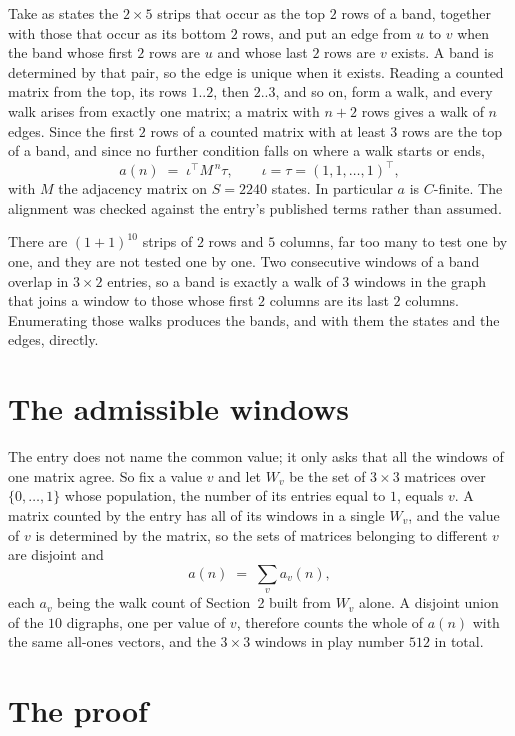 \documentclass[11pt,a4paper]{article}
\theoremstyle{plain}
\theoremstyle{definition}
\begin{document}
Take as states the $2\times5$ strips that occur as the top $2$ rows of a band,
together with those that occur as its bottom $2$ rows, and put an edge from $u$ to $v$
when the band whose first $2$ rows are $u$ and whose last $2$ rows are $v$ exists.
A band is determined by that pair, so the edge is unique when it exists. Reading a counted
matrix from the top, its rows $1..2$, then $2..3$, and so on, form a walk, and every
walk arises from exactly one matrix; a matrix with $n+2$ rows gives a walk of $n$ edges.
Since the first $2$ rows of a counted matrix with at least $3$ rows are the top of a
band, and since no further condition falls on where a walk starts or ends,
\[
a(n)\;=\;\iota^{\!\top}M^{\,n}\tau ,\qquad \iota=\tau=(1,1,\dots,1)^{\!\top},
\]
with $M$ the adjacency matrix on $S=2240$ states. In particular $a$ is $C$-finite. The
alignment was checked against the entry's published terms rather than assumed.

There are $(1 + 1)^{10}$ strips of $2$ rows and $5$ columns, far too
many to test one by one, and they are not tested one by one. Two consecutive windows of a band
overlap in $3\times2$ entries, so a band is exactly a walk of $3$ windows in
the graph that joins a window to those whose first $2$ columns are its last $2$
columns. Enumerating those walks produces the bands, and with them the states and the edges,
directly.

\section{The admissible windows}

The entry does not name the common value; it only asks that all the windows of one matrix agree.
So fix a value $v$ and let $W_v$ be the set of $3\times3$ matrices over
$\{0,\dots,1\}$ whose population, the number of its entries equal to $1$, equals $v$. A matrix counted by the entry has all of
its windows in a single $W_v$, and the value of $v$ is determined by the matrix, so the sets of
matrices belonging to different $v$ are disjoint and
\[
a(n)\;=\;\sum_v a_v(n),
\]
each $a_v$ being the walk count of Section~2 built from $W_v$ alone. A disjoint union of the
$10$ digraphs, one per value of $v$, therefore counts the whole of $a(n)$ with the same
all-ones vectors, and the $3\times3$ windows in play number $512$ in total.

\section{The proof}
\end{document}
